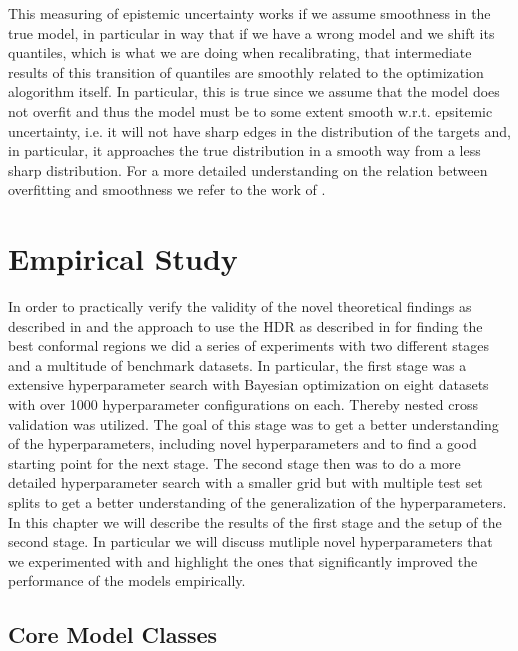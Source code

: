 This measuring of epistemic uncertainty works if we assume smoothness in the true model, in particular in way that if we have a wrong model and we shift its quantiles, which is what we are doing when recalibrating, that intermediate results of this transition of quantiles are smoothly related to the optimization alogorithm itself. In particular, this is true since we assume that the model does not overfit and thus the model must be to some extent smooth w.r.t. epsitemic uncertainty, i.e. it will not have sharp edges in the distribution of the targets and, in particular, it approaches the true distribution in a smooth way from a less sharp distribution. For a more detailed understanding on the relation between overfitting and smoothness we refer to the work of \cite{bishop2006pattern}.

\chapter{Empirical Study}\label{chap:empirical_study}

In order to practically verify the validity of the novel theoretical findings as described in  and the approach to use the HDR as described in  for finding the best conformal regions we did a series of experiments with two different stages and a multitude of benchmark datasets. In particular, the first stage was a extensive hyperparameter search with Bayesian optimization on eight datasets with over 1000 hyperparameter configurations on each. Thereby nested cross validation was utilized. The goal of this stage was to get a better understanding of the hyperparameters, including novel hyperparameters and to find a good starting point for the next stage. The second stage then was to do a more detailed hyperparameter search with a smaller grid but with multiple test set splits to get a better understanding of the generalization of the hyperparameters. In this chapter we will describe the results of the first stage and the setup of the second stage. In particular we will discuss mutliple novel hyperparameters that we experimented with and highlight the ones that significantly improved the performance of the models empirically.

\section{Core Model Classes}\label{sec:core_model_classes}

